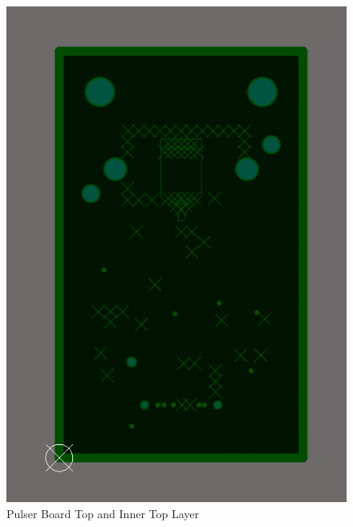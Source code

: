 \documentclass[a4paper,11pt]{article}
\begin{document}
\begin{figure}[htbp]
\includegraphics[scale=0.5]{PulserBoard0.9InnerTopGround.png}
\caption{Pulser Board Top and Inner Top Layer\label{fig:PulserBoard0.9TopLayers}}
\end{figure}
\end{document}
